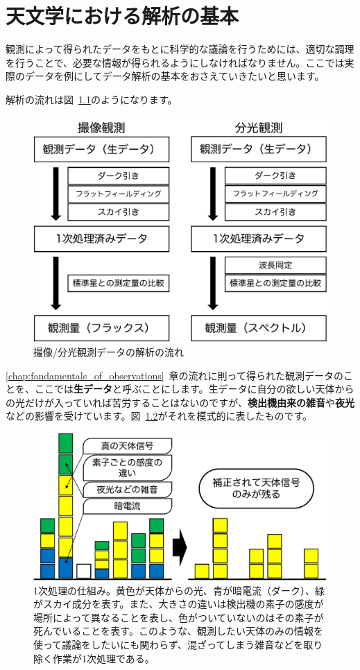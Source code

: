 \chapter{天文学における解析の基本} %
\label{chap:fandamentals_of_analysis}
観測によって得られたデータをもとに科学的な議論を行うためには、適切な調理を行うことで、必要な情報が得られるようにしなければなりません。ここでは実際のデータを例にしてデータ解析の基本をおさえていきたいと思います。\par
解析の流れは図~\ref{fig:kaiseki_nagare}のようになります。
\begin{figure}
  \centering
	\includegraphics[width=0.7\linewidth]{./fig/chap_5/photo_spec.pdf}
	\caption{撮像/分光観測データの解析の流れ}
  \label{fig:kaiseki_nagare}
\end{figure}
\ref{chap:fandamentals_of_observations}~章の流れに則って得られた観測データのことを、ここでは\textbf{生データ}と呼ぶことにします。生データに自分の欲しい天体からの光だけが入っていれば苦労することはないのですが、\textbf{検出機由来の雑音}や\textbf{夜光}などの影響を受けています。図~\ref{fig:initial_reduction}がそれを模式的に表したものです。
\begin{figure}
  \centering
	\includegraphics[width=0.7\linewidth]{./fig/chap_5/initial_reduction.pdf}
	\caption[1次処理の仕組み]{1次処理の仕組み。黄色が天体からの光、青が暗電流（ダーク）、緑がスカイ成分を表す。また、大きさの違いは検出機の素子の感度が場所によって異なることを表し、色がついていないのはその素子が死んでいることを表す。このような、観測したい天体のみの情報を使って議論をしたいにも関わらず、混ざってしまう雑音などを取り除く作業が1次処理である。}
  \label{fig:initial_reduction}
\end{figure}
